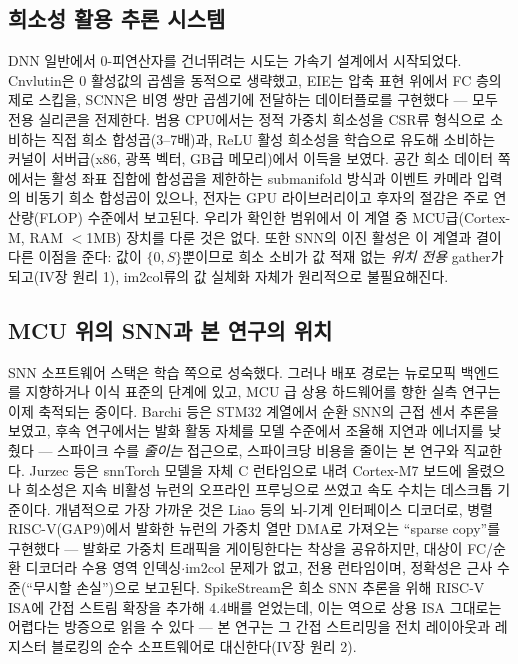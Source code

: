 \subsection{희소성 활용 추론 시스템}\label{sec:sparse-sys}

DNN 일반에서 0-피연산자를 건너뛰려는 시도는 가속기 설계에서
시작되었다. Cnvlutin은 0 활성값의 곱셈을 동적으로
생략했고\cite{albericio2016cnvlutin}, EIE는 압축 표현 위에서
FC 층의 제로 스킵을\cite{han2016eie}, SCNN은 비영 쌍만 곱셈기에
전달하는 데이터플로를\cite{parashar2017scnn} 구현했다 --- 모두 전용
실리콘을 전제한다. 범용 CPU에서는 정적 가중치 희소성을 CSR류
형식으로 소비하는 직접 희소 합성곱(3--7배)\cite{park2017faster}과,
ReLU 활성 희소성을 학습으로 유도해 소비하는
커널\cite{kurtz2020inducing}이
서버급(x86, 광폭 벡터, GB급 메모리)에서 이득을 보였다.
공간 희소 데이터 쪽에서는 활성 좌표 집합에 합성곱을 제한하는
submanifold 방식\cite{graham2018submanifold}과 이벤트 카메라 입력의
비동기 희소 합성곱\cite{messikommer2020event}이 있으나, 전자는 GPU
라이브러리이고 후자의 절감은 주로 연산량(FLOP) 수준에서 보고된다.
우리가 확인한 범위에서 이 계열 중 MCU급(Cortex-M, RAM $<$1MB)
장치를 다룬 것은 없다. 또한 SNN의 이진 활성은 이 계열과 결이 다른
이점을 준다: 값이 $\{0,S\}$뿐이므로 희소 소비가 값 적재 없는
\emph{위치 전용} gather가 되고(IV장 원리 1), im2col류의 값
실체화\cite{chellapilla2006high} 자체가 원리적으로 불필요해진다.

\subsection{MCU 위의 SNN과 본 연구의 위치}\label{sec:positioning}

SNN 소프트웨어 스택은 학습 쪽으로
성숙했다\cite{eshraghian2023training,fang2023spikingjelly,pehle2021norse}.
그러나 배포 경로는 뉴로모픽 백엔드를 지향하거나 이식 표준의
단계\cite{pedersen2024nir}에 있고, MCU 급 상용 하드웨어를 향한
실측 연구는 이제 축적되는 중이다. Barchi 등은 STM32 계열에서 순환
SNN의 근접 센서 추론을 보였고\cite{barchi2021shm}, 후속 연구에서는
발화 활동 자체를 모델 수준에서 조율해 지연과 에너지를
낮췄다\cite{barchi2024tuning} --- 스파이크
수를 \emph{줄이는} 접근으로, 스파이크당 비용을 줄이는 본 연구와
직교한다. Jurzec 등은 snnTorch 모델을 자체 C 런타임으로 내려 Cortex-M7
보드에 올렸으나 희소성은 지속 비활성 뉴런의 오프라인 프루닝으로
쓰였고 속도 수치는 데스크톱 기준이다\cite{jurzec2025compression}.
개념적으로 가장 가까운 것은 Liao 등의 뇌-기계 인터페이스
디코더로, 병렬 RISC-V(GAP9)에서 발화한 뉴런의 가중치 열만 DMA로
가져오는 ``sparse copy''를 구현했다\cite{liao2024snndecoder} ---
발화로 가중치 트래픽을 게이팅한다는 착상을 공유하지만, 대상이
FC/순환 디코더라 수용 영역 인덱싱$\cdot$im2col 문제가 없고, 전용
런타임이며, 정확성은 근사 수준(``무시할 손실'')으로 보고된다.
SpikeStream은 희소 SNN 추론을 위해 RISC-V ISA에 간접 스트림
확장을 추가해 4.4배를 얻었는데\cite{manoni2025spikestream}, 이는
역으로 상용 ISA 그대로는 어렵다는 방증으로 읽을 수 있다 --- 본
연구는 그 간접 스트리밍을 전치 레이아웃과 레지스터 블로킹의 순수
소프트웨어로 대신한다(IV장 원리 2).

